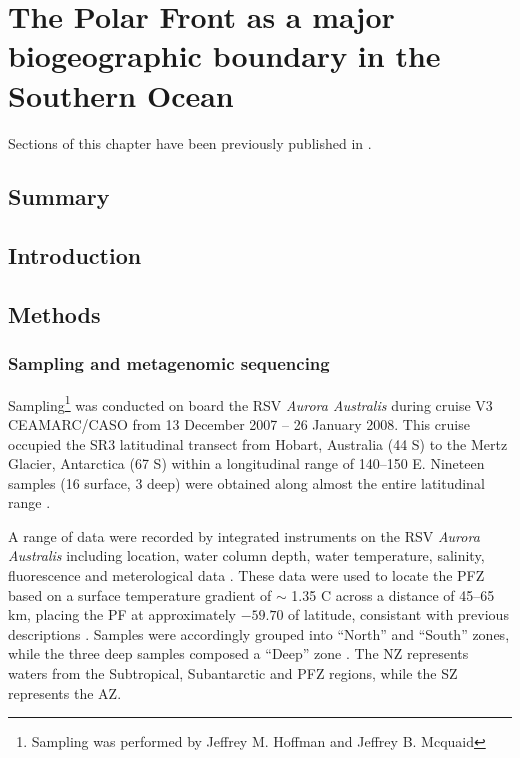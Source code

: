 \chapter{The Polar Front as a major biogeographic boundary in the Southern Ocean} 
\label{ch:polarfront}

Sections of this chapter have been previously published in .

\section{Summary}

\section{Introduction}


\section{Methods}
\subsection{Sampling and metagenomic sequencing}

Sampling\footnote{Sampling was performed by Jeffrey M. Hoffman and Jeffrey B. Mcquaid} was conducted on board the RSV \emph{Aurora Australis} during cruise V3 \ac{CEAMARC/CASO} from 13 December 2007 -- 26 January 2008. 
This cruise occupied the SR3 latitudinal transect from Hobart, Australia (44\textdegree{} S) to the Mertz Glacier, Antarctica (67\textdegree{} S) within a longitudinal range of 140--150\textdegree{} E.
Nineteen samples (16 surface, 3 deep) were obtained along almost the entire latitudinal range .



A range of data were recorded by integrated instruments on the RSV \emph{Aurora Australis} including location, water column depth, water temperature, salinity, fluorescence and meterological data .
These data were used to locate the \ac{PFZ} based on a surface temperature gradient of $\sim$ 1.35 \textdegree{}C across a distance of 45--65 km, placing the \ac{PF} at approximately $-59.70$\textdegree{} of latitude, consistant with previous descriptions \cite{Moore:1999to,Sokolov:2002tc}.
Samples were accordingly grouped into ``North'' and ``South'' zones, while the three deep samples composed a ``Deep'' zone .
The \ac{NZ} represents waters from the Subtropical, Subantarctic and \ac{PFZ} regions, while the \ac{SZ} represents the \ac{AZ}.

